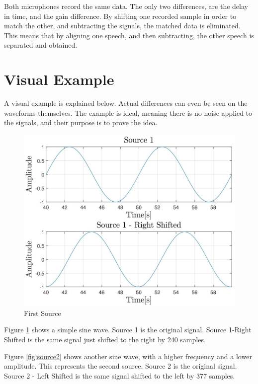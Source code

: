 Both microphones record the same data. The only two differences, are the delay in time,
and the gain difference. By shifting one recorded sample in order to match the other,
and subtracting the signals, the matched data is eliminated. This means that by aligning 
one speech, and then subtracting, the other speech is separated and obtained.

\newpage

\section{Visual Example}
A visual example is explained below. Actual differences can even be seen on the waveforms themselves.
The example is ideal, meaning there is no noise applied to the signals, and their purpose is to 
prove the idea.

\begin{figure}[htp]
	\centering
	\includegraphics[width=\textwidth]{Illustrations/source1.jpg}
	\caption{First Source}
	\label{fig:source1}
\end{figure}

Figure \ref{fig:source1} shows a simple sine wave. Source 1 is the original signal. Source 1-Right Shifted
is the same signal just shifted to the right by 240 samples.

\newpage

Figure \ref{fig:source2} shows another sine wave, with a higher frequency and a lower amplitude. This 
represents the second source. Source 2 is the original signal. Source 2 - Left Shifted is the same signal
shifted to the left by 377 samples.


